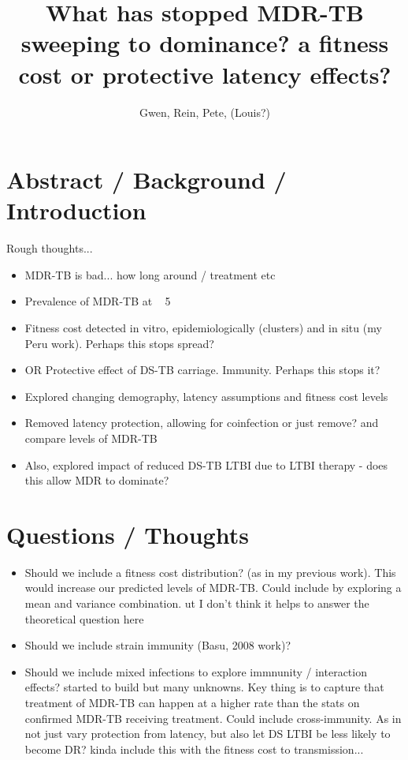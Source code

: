 \documentclass{article}
\title{What has stopped MDR-TB sweeping to dominance? a fitness cost or protective latency effects?}
\author{Gwen, Rein, Pete, (Louis?)}
\date{}
\begin{document}
 
\maketitle{}

\tableofcontents{}

\clearpage

\section{Abstract / Background / Introduction}

Rough thoughts... 

\begin{itemize}
	\item MDR-TB is bad... how long around / treatment etc
	\item Prevalence of MDR-TB at ~ 5%
	\item Fitness cost detected in vitro, epidemiologically (clusters) and in situ (my Peru work). Perhaps this stops spread? 
	\item OR Protective effect of DS-TB carriage. Immunity. Perhaps this stops it? 
	\item Explored changing demography, latency assumptions and fitness cost levels
	\item Removed latency protection, allowing for coinfection or just remove? and compare levels of MDR-TB
	\item Also, explored impact of reduced DS-TB LTBI due to LTBI therapy - does this allow MDR to dominate? 
\end{itemize}

\clearpage

\section{Questions / Thoughts}

\begin{itemize}
	\item Should we include a fitness cost distribution? (as in my previous work). This would increase our predicted levels of MDR-TB. Could include by exploring a mean and variance combination. ut I don't think it helps to answer the theoretical question here
	\item Should we include strain immunity (Basu, 2008 work)? 
	\item Should we include mixed infections to explore immnunity / interaction effects? started to build but many unknowns. Key thing is to capture that treatment of MDR-TB can happen at a higher rate than the stats on confirmed MDR-TB receiving treatment. Could include cross-immunity. As in not just vary protection from latency, but also let DS LTBI be less likely to become DR? kinda include this with the fitness cost to transmission... 
\end{itemize}
\end{document}
